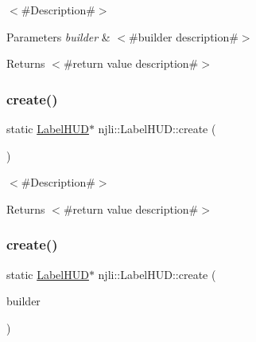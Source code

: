 $<$\#\+Description\#$>$


\begin{DoxyParams}{Parameters}
{\em builder} & $<$\#builder description\#$>$\\
\hline
\end{DoxyParams}
\begin{DoxyReturn}{Returns}
$<$\#return value description\#$>$ 
\end{DoxyReturn}
\mbox{\label{classnjli_1_1_label_h_u_d_ac78877c0e1b98c5837779544fe192b48}} 
\subsubsection{\texorpdfstring{create()}{create()}\hspace{0.1cm}{\footnotesize\ttfamily [2/3]}}
{\footnotesize\ttfamily static \mbox{\hyperlink{classnjli_1_1_label_h_u_d}{Label\+H\+UD}}$\ast$ njli\+::\+Label\+H\+U\+D\+::create (\begin{DoxyParamCaption}{ }\end{DoxyParamCaption})\hspace{0.3cm}{\ttfamily [static]}}

$<$\#\+Description\#$>$

\begin{DoxyReturn}{Returns}
$<$\#return value description\#$>$ 
\end{DoxyReturn}
\mbox{\label{classnjli_1_1_label_h_u_d_a7c23d00e02b8595433e000540378659c}} 
\subsubsection{\texorpdfstring{create()}{create()}\hspace{0.1cm}{\footnotesize\ttfamily [3/3]}}
{\footnotesize\ttfamily static \mbox{\hyperlink{classnjli_1_1_label_h_u_d}{Label\+H\+UD}}$\ast$ njli\+::\+Label\+H\+U\+D\+::create (\begin{DoxyParamCaption}\item[{const \mbox{\hyperlink{classnjli_1_1_label_h_u_d_builder}{Label\+H\+U\+D\+Builder}} \&}]{builder }\end{DoxyParamCaption})\hspace{0.3cm}{\ttfamily [static]}}

